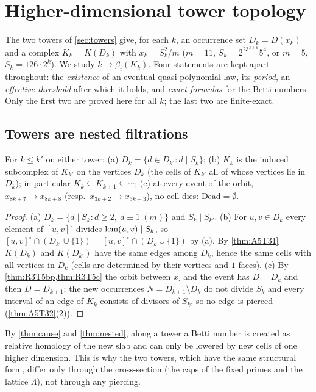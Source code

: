 \section{Higher-dimensional tower topology}\label{sec:towertop}
The two towers of \cref{sec:towers} give, for each $k$, an occurrence set $D_k=D(x_k)$ and a complex $K_k=K(D_k)$ with $x_k=S_k^2/m$ ($m=11$, $S_k=2^23^{3+k}5^4$, or $m=5$, $S_k=126\cdot2^k$). We study $k\mapsto\beta_i(K_k)$. Four statements are kept apart throughout: the \emph{existence} of an eventual quasi-polynomial law, its \emph{period}, an \emph{effective threshold} after which it holds, and \emph{exact formulas} for the Betti numbers. Only the first two are proved here for all $k$; the last two are finite-exact.

\subsection{Towers are nested filtrations}
\begin{theorem}\label{thm:A5T51}
For $k\le k'$ on either tower: (a) $D_k=\{d\in D_{k'}:d\mid S_k\}$; (b) $K_k$ is the induced subcomplex of $K_{k'}$ on the vertices $D_k$ (the cells of $K_{k'}$ all of whose vertices lie in $D_k$); in particular $K_k\subseteq K_{k+1}\subseteq\cdots$; (c) at every event of the orbit, $x_{8k+7}\to x_{8k+8}$ (resp.\ $x_{3k+2}\to x_{3k+3}$), no cell dies: $\mathrm{Dead}=\emptyset$.
\end{theorem}
\begin{proof}
(a) $D_k=\{d\mid S_k:d\ge2,\ d\equiv1\ (m)\}$ and $S_k\mid S_{k'}$. (b) For $u,v\in D_k$ every element of $[u,v]^\circ$ divides $\operatorname{lcm}(u,v)\mid S_k$, so $[u,v]^\circ\cap(D_{k'}\cup\{1\})=[u,v]^\circ\cap(D_k\cup\{1\})$ by (a). By \cref{thm:A5T31} $K(D_k)$ and $K(D_{k'})$ have the same edges among $D_k$, hence the same cells with all vertices in $D_k$ (cells are determined by their vertices and $1$-faces). (c) By \cref{thm:R3T5bp,thm:R3T5c} the orbit between $x_{\cdot}$ and the event has $D=D_k$ and then $D=D_{k+1}$; the new occurrences $N=D_{k+1}\setminus D_k$ do not divide $S_k$ and every interval of an edge of $K_k$ consists of divisors of $S_k$, so no edge is pierced (\cref{thm:A5T32}(2)). \qedhere
\end{proof}
\begin{remark}
By \cref{thm:cause} and \cref{thm:nested}, along a tower a Betti number is created as relative homology of the new slab and can only be lowered by new cells of one higher dimension. This is why the two towers, which have the same structural form, differ only through the cross-section (the caps of the fixed primes and the lattice $\Lambda$), not through any piercing.
\end{remark}
